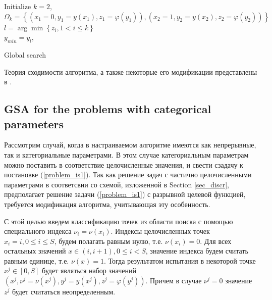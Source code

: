 \documentclass[preprint,12pt]{elsarticle}
\begin{document}
\begin{algorithm}
\LinesNumbered
 Initialize $k=2$, $\Omega_k= \left\{ (x_1=0, y_1=y(x_1), z_1=\varphi(y_1)), (x_2=1, y_2=y(x_2), z_2=\varphi(y_2)) \right\}$\\
 $l = \arg \min \left\{ z_i, 1 < i \leq k \right\}$\\
 $y_{min} = y_l$, \\ 
 \caption{Global search}\label{alg_GSA}
\end{algorithm}

Теория сходимости алгоритма, а также некоторые его модификации представлены в \cite{Strongin2000}.

\subsection{GSA for the problems with categorical parameters}
\label{sec_mGSA}

Рассмотрим случай, когда в настраиваемом алгоритме имеются как непрерывные, так и категориальные параметрами. 
В этом случае категориальным параметрам можно поставить в соответствие целочисленные значения, и свести сзадачу к постановке (\ref{problem_is1}).
Так как решение задач с частично целочисленными параметрами в соответсвии со схемой, изложенной в Section \ref{sec_discr}, предполагает решение задачи (\ref{problem_is1}) с разрывной целевой функцией, требуется модификация алгоритма, учитывающая эту особенность.

С этой целью введем классификацию точек из области поиска с помощью специального индекса $\nu_i=\nu(x_i)$.
Индексы целочисленных точек $x_i = i, 0\leq i \leq S$, будем полагать равным нулю, т.е. $\nu(x_i) = 0$. Для всех остальных значений $x\in(i,i+1),  0 \leq i < S$, значение индекса будем считать равным единице, т.е. $\nu(x) = 1$. Тогда результатом испытания в некоторой точке $x^j\in[0,S]$ будет являться набор значений
$(x^j, \nu^j=\nu(x^j), y^j=y(x^j), z^j = \varphi(y^j))$. Причем в случае $\nu^j=0$ значение $z^j$ будет считаться неопределенным.
\end{document}
